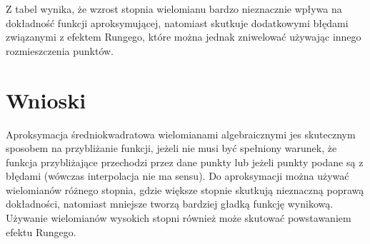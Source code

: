 \documentclass{article}
\begin{document}
Z tabel wynika, że wzrost stopnia wielomianu bardzo nieznacznie wpływa na dokładność funkcji aproksymującej, natomiast skutkuje
dodatkowymi błędami związanymi z efektem Rungego, które można jednak zniwelować używając innego rozmieszczenia punktów.

\newpage
\section{Wnioski}
Aproksymacja średniokwadratowa wielomianami algebraicznymi jes skutecznym sposobem na przybliżanie funkcji, jeżeli nie musi
być spełniony warunek, że funkcja przybliżające przechodzi przez dane punkty lub jeżeli punkty podane są z błędami (wówczas
interpolacja nie ma sensu). Do aproksymacji można używać wielomianów różnego stopnia, gdzie większe stopnie skutkują nieznaczną
poprawą dokładności, natomiast mniejsze tworzą bardziej gładką funkcję wynikową. Używanie wielomianów wysokich stopni również
może skutować powstawaniem efektu Rungego.
\end{document}
